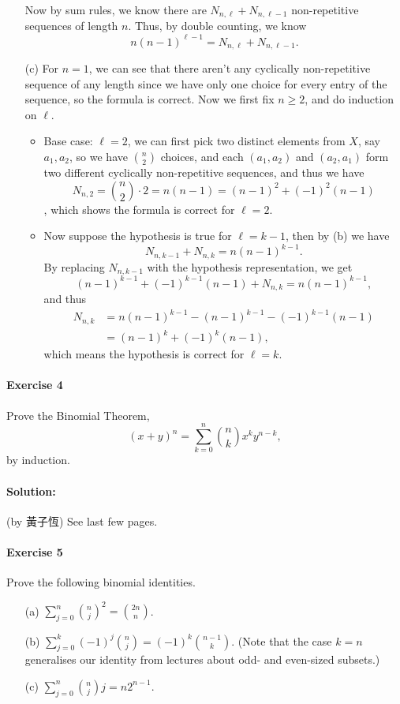 \documentclass[a4paper,12pt]{article}
\begin{document}
\begin{itemize}
\begin{itemize}
	\end{itemize}
	Now by sum rules, we know there are \(N_{n, \ell } + N_{n, \ell - 1}\) non-repetitive sequences of length \(n\). Thus, by double counting, we know 
	\[
		n(n-1)^{\ell - 1} = N_{n, \ell} + N_{n, \ell - 1}.
	\]  
	\item[(c)]For \(n = 1\), we can see that there aren't any cyclically non-repetitive sequence of any length since we have only one choice for every entry of the sequence, so the formula is correct. Now we first fix \(n \ge 2\), and do induction on \(\ell \). 
	\begin{itemize}
		\item Base case: \(\ell  = 2\), we can first pick two distinct elements from \(X\), say \(a_1, a_2\), so we have \(\binom{n}{2}\) choices, and each \((a_1, a_2)\) and \((a_2, a_1)\) form two different cyclically non-repetitive sequences, and thus we have
		\[
			N_{n, 2} = \binom{n}{2} \cdot 2 = n(n - 1) = (n - 1)^{2} + (-1)^2(n - 1) 
		\], which shows the formula is correct for \(\ell = 2\). 
		\item Now suppose the hypothesis is true for \(\ell = k - 1\), then by (b) we have 
		\[
			N_{n, k-1} + N_{n, k} = n(n - 1)^{k - 1}.
		\] By replacing \(N_{n, k - 1}\) with the hypothesis representation, we get 
		\[
			(n - 1)^{k - 1} + (-1)^{k - 1}(n - 1) + N_{n, k} = n(n - 1)^{k - 1},
		\] and thus 
		\begin{align*}
			N_{n, k} &= n(n - 1)^{k - 1} - (n - 1)^{k - 1} - (-1)^{k - 1}(n - 1) \\
			&= (n - 1)^k + (-1)^k(n - 1),
		\end{align*}which means the hypothesis is correct for \(\ell = k\). 
	\end{itemize}
\end{itemize}

\paragraph{Exercise 4}  Prove the Binomial Theorem, 
\[ (x + y)^n = \sum_{k=0}^n \binom{n}{k} x^k y^{n-k},\]
by induction.
\paragraph{Solution:} (by 黃子恆) See last few pages.


\paragraph{Exercise 5}  
Prove the following binomial identities.
\begin{itemize}
	\item[(a)] $\sum_{j=0}^n \binom{n}{j}^2 = \binom{2n}{n}$.
	\item[(b)] $\sum_{j=0}^k (-1)^j \binom{n}{j} = (-1)^k \binom{n-1}{k}$. (Note that the case $k = n$ generalises our identity from lectures about odd- and even-sized subsets.)
	\item[(c)] $\sum_{j=0}^n \binom{n}{j} j = n2^{n-1}$.
\end{itemize}
\end{document}
